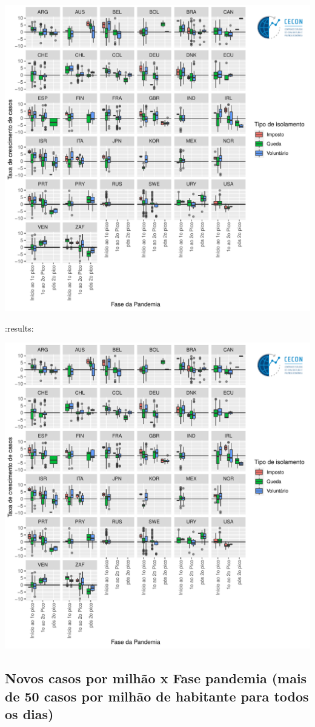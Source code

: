\documentclass{SelfArx}
\begin{document}
\begin{center}
\includegraphics[width=.9\linewidth]{./figs/COVID/Casos_Policy_10_Todos.pdf}
\end{center}
:results:
\begin{center}
\includegraphics[width=.9\linewidth]{./figs/COVID/Casos_Policy_10_Todos.pdf}
\end{center}
\subsection*{Novos casos por milhão x Fase pandemia (mais de 50 casos por milhão de habitante para todos os dias)}
\label{sec:org467dfbe}
\end{document}
